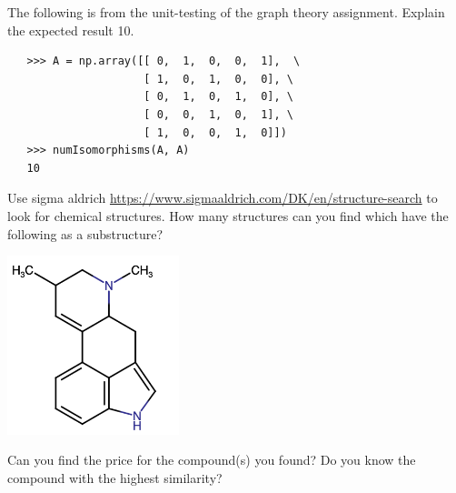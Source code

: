 \documentclass[10pt]{article}
\begin{document}

\noindent The following is from the unit-testing of the graph theory assignment. Explain the expected result 10.

\begin{verbatim}
   >>> A = np.array([[ 0,  1,  0,  0,  1],  \
                     [ 1,  0,  1,  0,  0], \
                     [ 0,  1,  0,  1,  0], \
                     [ 0,  0,  1,  0,  1], \
                     [ 1,  0,  0,  1,  0]])
   >>> numIsomorphisms(A, A)
   10
\end{verbatim}



\noindent Use sigma aldrich \url{https://www.sigmaaldrich.com/DK/en/structure-search} to look for chemical structures. How many structures can you find which have the following as a substructure?

\includegraphics[width=5cm]{lsd-sub.png}

Can you find the price for the compound(s) you found? Do you know the compound with the highest similarity?
\end{document}
